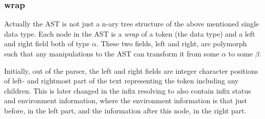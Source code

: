 \subsubsection{wrap}

Actually the AST is not just a n-ary tree structure of the above mentioned
single data type. Each node in the AST is a \textit{wrap} of a token (the data
type) and a left and right field both of type $\alpha$. These two fields, left
and right, are polymorph such that any manipulations to the AST can transform it
from some $\alpha$ to some $\beta$. 

Initially, out of the parser, the left and right fields are integer character
positions of left- and rightmost part of the text representing the token
including any children. This is later changed in the infix resolving to also
contain infix status and environment information, where the environment
information is that just before, in the left part, and the information after
this node, in the right part.






